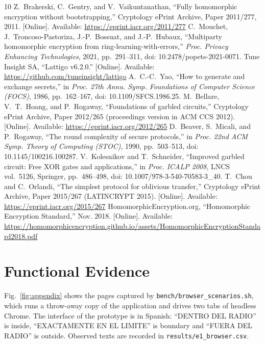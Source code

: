\documentclass[conference,letterpaper]{IEEEtran}
\begin{document}
\begin{thebibliography}{10}
 Z.~Brakerski, C.~Gentry, and V.~Vaikuntanathan, ``Fully homomorphic encryption without bootstrapping,'' Cryptology ePrint Archive, Paper 2011/277, 2011. [Online]. Available: \url{https://eprint.iacr.org/2011/277}
 C.~Mouchet, J.~Troncoso-Pastoriza, J.-P.~Bossuat, and J.-P.~Hubaux, ``Multiparty homomorphic encryption from ring-learning-with-errors,'' \emph{Proc. Privacy Enhancing Technologies}, 2021, pp.~291--311, doi: 10.2478/popets-2021-0071.
 Tune Insight SA, ``Lattigo v6.2.0.'' [Online]. Available: \url{https://github.com/tuneinsight/lattigo}
 A.~C.-C.~Yao, ``How to generate and exchange secrets,'' in \emph{Proc. 27th Annu. Symp. Foundations of Computer Science (FOCS)}, 1986, pp.~162--167, doi: 10.1109/SFCS.1986.25.
 M.~Bellare, V.~T.~Hoang, and P.~Rogaway, ``Foundations of garbled circuits,'' Cryptology ePrint Archive, Paper 2012/265 (proceedings version in ACM CCS 2012). [Online]. Available: \url{https://eprint.iacr.org/2012/265}
 D.~Beaver, S.~Micali, and P.~Rogaway, ``The round complexity of secure protocols,'' in \emph{Proc. 22nd ACM Symp. Theory of Computing (STOC)}, 1990, pp.~503--513, doi: 10.1145/100216.100287.
 V.~Kolesnikov and T.~Schneider, ``Improved garbled circuit: Free XOR gates and applications,'' in \emph{Proc. ICALP 2008}, LNCS vol.~5126, Springer, pp.~486--498, doi: 10.1007/978-3-540-70583-3\_40.
 T.~Chou and C.~Orlandi, ``The simplest protocol for oblivious transfer,'' Cryptology ePrint Archive, Paper 2015/267 (LATINCRYPT 2015). [Online]. Available: \url{https://eprint.iacr.org/2015/267}
 HomomorphicEncryption.org, ``Homomorphic Encryption Standard,'' Nov. 2018. [Online]. Available: \url{https://homomorphicencryption.github.io/assets/HomomorphicEncryptionStandard2018.pdf}
\end{thebibliography}

\appendices
\section{Functional Evidence}
Fig.~\ref{fig:appendix} shows the pages captured by \texttt{bench/browser\_scenarios.sh}, which runs a throw-away copy of the application and drives two tabs of headless Chrome. The interface of the prototype is in Spanish: ``DENTRO DEL RADIO'' is inside, ``EXACTAMENTE EN EL LIMITE'' is boundary and ``FUERA DEL RADIO'' is outside. Observed texts are recorded in \texttt{results/e1\_browser.csv}.
\end{document}
